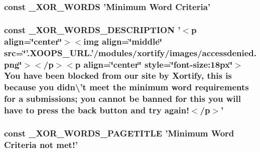 \hypertarget{ban_8php_a45fd9bade6417b9981702ac84812014c}{
\subsubsection[{\-\_\-\-X\-O\-R\-\_\-\-W\-O\-R\-D\-S}]{\setlength{\rightskip}{0pt plus 5cm}const \-\_\-\-X\-O\-R\-\_\-\-W\-O\-R\-D\-S 'Minimum Word Criteria'}}\label{ban_8php_a45fd9bade6417b9981702ac84812014c}
\hypertarget{ban_8php_a901b1160bf5dfe4696745afbd2f087e9}{
\subsubsection[{\-\_\-\-X\-O\-R\-\_\-\-W\-O\-R\-D\-S\-\_\-\-D\-E\-S\-C\-R\-I\-P\-T\-I\-O\-N}]{\setlength{\rightskip}{0pt plus 5cm}const \-\_\-\-X\-O\-R\-\_\-\-W\-O\-R\-D\-S\-\_\-\-D\-E\-S\-C\-R\-I\-P\-T\-I\-O\-N '$<$p align=\char`\"{}center\char`\"{}$>$$<$img align=\char`\"{}middle\char`\"{} src=\char`\"{}'.X\-O\-O\-P\-S\-\_\-\-U\-R\-L.'/modules/xortify/images/accessdenied.\-png\char`\"{}$>$$<$/p$>$$<$p align=\char`\"{}center\char`\"{} style=\char`\"{}font-\/size\-:18px\char`\"{}$>$You have been blocked from our site by Xortify, this is because you didn\textbackslash{}'t meet the minimum word requirements for a submissions; you cannot be banned for this you will have to press the back button and try again!$<$/p$>$'}}\label{ban_8php_a901b1160bf5dfe4696745afbd2f087e9}
\hypertarget{ban_8php_afdf5096fd748fba60a1f0d81dde475d7}{
\subsubsection[{\-\_\-\-X\-O\-R\-\_\-\-W\-O\-R\-D\-S\-\_\-\-P\-A\-G\-E\-T\-I\-T\-L\-E}]{\setlength{\rightskip}{0pt plus 5cm}const \-\_\-\-X\-O\-R\-\_\-\-W\-O\-R\-D\-S\-\_\-\-P\-A\-G\-E\-T\-I\-T\-L\-E 'Minimum Word Criteria not met!'}}\label{ban_8php_afdf5096fd748fba60a1f0d81dde475d7}
